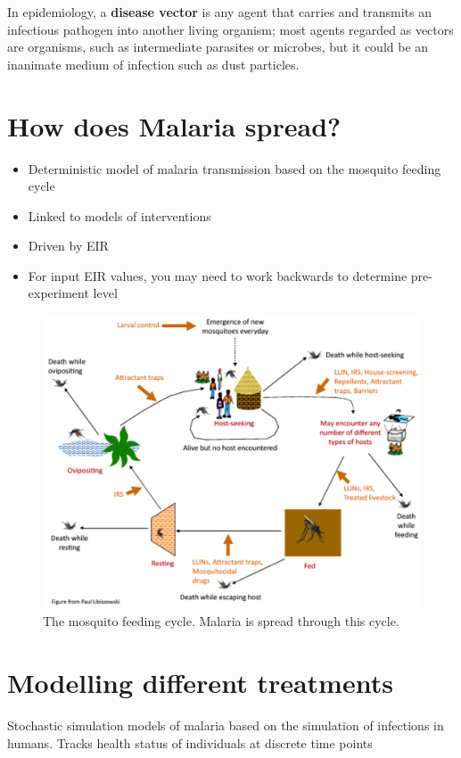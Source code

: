 \documentclass[]{scrartcl}
\begin{document}
\begin{itemize}
In epidemiology, a \textbf{disease vector} is any agent that carries and transmits an infectious pathogen into another living organism; most agents regarded as vectors are organisms, such as intermediate parasites or microbes, but it could be an inanimate medium of infection such as dust particles.

\section{How does Malaria spread?}
\begin{itemize}
\item Deterministic model of malaria transmission based on the mosquito feeding cycle
\item Linked to models of interventions
\item Driven by EIR
\item For input EIR values, you may need to work backwards to determine pre-experiment level
\end{itemize}


\begin{figure}
\includegraphics[width=\textwidth]{images/malariacycle.png}
\caption{The mosquito feeding cycle. Malaria is spread through this cycle.}
\end{figure}

\section{Modelling different treatments}

Stochastic simulation models of malaria based on the simulation of infections in humans. Tracks health status of individuals at discrete time points


\end{itemize}
\end{document}

